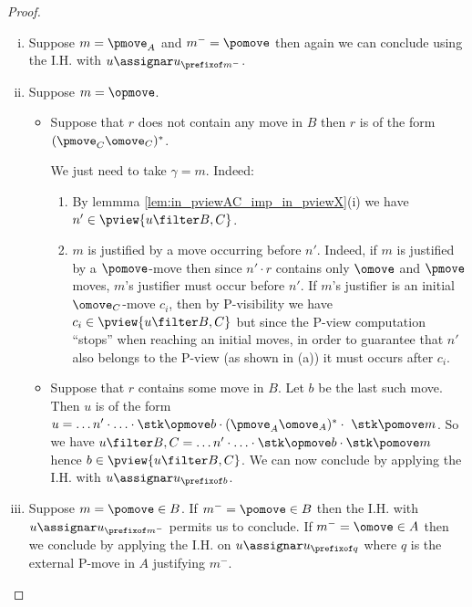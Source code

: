 \begin{proof}
\begin{enumerate}[i.]
\item Suppose $m = \pmove_A$ and $m^- = \pomove$ then again we can conclude using the I.H. with $u \assignar u_{\prefixof m^-}$.

\item Suppose $m = \opmove$.
\begin{itemize}[-]
\item Suppose that $r$ does not contain any move in $B$  then $r$ is of the form $(\pmove_C \omove_C)^*$.

We just need to take $\gamma = m$.
Indeed:
\begin{enumerate}
\item By lemmma \ref{lem:in_pviewAC_imp_in_pviewX}(i)
we have $n'\in \pview{u\filter B,C}$.

\item  $m$ is justified by a move occurring before $n'$.
Indeed, if $m$ is justified by a $\pomove$-move then since $n' \cdot r$ contains only $\omove$ and $\pmove$ moves, $m$'s justifier must occur before $n'$.
If $m$'s justifier is an initial $\omove_C$-move $c_i$, then
by P-visibility we have $c_i \in \pview{u\filter B,C}$
but since the P-view computation ``stops'' when reaching an initial moves, in order to guarantee that $n'$ also belongs to the P-view (as shown in (a)) it must
occurs after $c_i$.
\end{enumerate}


\item Suppose that $r$ contains some move in $B$. Let $b$ be the last such move. Then $u$ is of the form $u = \ldots n' \cdot \ldots \cdot \stk\opmove  b \cdot (\pmove_A \omove_A)^* \cdot\ \stk\pomove m $.
So we have
$u\filter B,C = \ldots n' \cdot \ldots \cdot \stk\opmove  b \cdot \stk\pomove m $ hence $b \in \pview{u\filter B,C}$. We can now
conclude by applying the I.H. with $u \assignar u_{\prefixof b}$.
\end{itemize}

\item Suppose $m = \pomove \in B$.
If $m^- = \pomove \in B$ then the I.H. with $u \assignar u_{\prefixof m^-}$ permits us to conclude.
If $m^- = \omove \in A$ then we conclude by applying the I.H. on $u \assignar u_{\prefixof q}$ where $q$ is the external P-move in $A$ justifying $m^-$.
\end{enumerate}
\end{proof}

